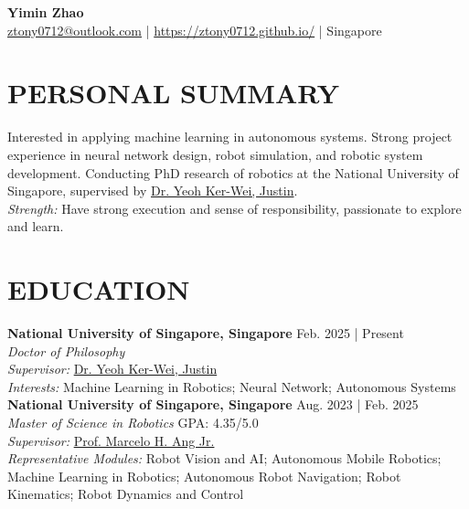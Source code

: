 \documentclass[a4paper,9pt]{extarticle}
\begin{document}
\pagestyle{fancy}
\renewcommand{\headrulewidth}{0pt}
\fancyhead{}
\fancyhead[R]{\textit{\today}}
\thispagestyle{empty} %

\begin{center}
\textbf{\Huge Yimin Zhao}\\ %

\faEnvelope \href{mailto:ztony0712@outlook.com}{ztony0712@outlook.com} | 
\faGlobe \href{https://ztony0712.github.io/}{https://ztony0712.github.io/} | 
\faUniversity Singapore %
\end{center}

\section*{PERSONAL SUMMARY}
\noindent
Interested in applying machine learning in autonomous systems. Strong project experience in neural network design, robot simulation, and robotic system development. Conducting PhD research of robotics at the National University of Singapore, supervised by \href{https://cde.nus.edu.sg/cee/staff/yeoh-ker-wei-justin/}{Dr. Yeoh Ker-Wei, Justin}. \\

\noindent
\textit{Strength:} Have strong execution and sense of responsibility, passionate to explore and learn.

\section*{EDUCATION}
\noindent
\textbf{National University of Singapore, Singapore} \hfill Feb. 2025 | Present \\ %
\textit{Doctor of Philosophy} \hfill   \\
\textit{Supervisor:} \href{https://cde.nus.edu.sg/cee/staff/yeoh-ker-wei-justin/}{Dr. Yeoh Ker-Wei, Justin} \\
\textit{Interests:} Machine Learning in Robotics; Neural Network; Autonomous Systems \\

\noindent
\textbf{National University of Singapore, Singapore} \hfill Aug. 2023 | Feb. 2025 \\ %
\textit{Master of Science in Robotics} \hfill GPA: 4.35/5.0 \\
\textit{Supervisor:} \href{https://guppy.mpe.nus.edu.sg/~mpeangh/}{Prof. Marcelo H. Ang Jr.} \\
\textit{Representative Modules:} Robot Vision and AI; Autonomous Mobile Robotics; Machine Learning in Robotics; Autonomous Robot Navigation; Robot Kinematics; Robot Dynamics and Control  \\
\end{document}
